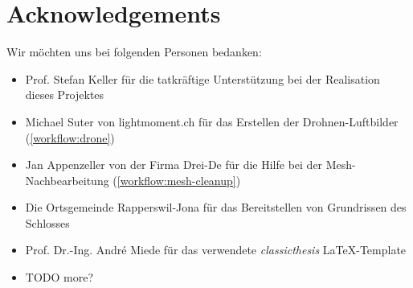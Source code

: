 

\bigskip


\begingroup

\let\clearpage\relax
\let\cleardoublepage\relax
\let\cleardoublepage\relax

\chapter*{Acknowledgements} %

Wir möchten uns bei folgenden Personen bedanken:

\begin{itemize}
	\item Prof. Stefan Keller für die tatkräftige Unterstützung bei der
		Realisation dieses Projektes
	\item Michael Suter von lightmoment.ch für das Erstellen der
		Drohnen-Luftbilder (\autoref{workflow:drone})
	\item Jan Appenzeller von der Firma Drei-De für die Hilfe bei der
		Mesh-Nachbearbeitung (\autoref{workflow:mesh-cleanup})
	\item Die Ortsgemeinde Rapperswil-Jona für das Bereitstellen von Grundrissen
		des Schlosses
	\item Prof. Dr.-Ing. André Miede für das verwendete \emph{classicthesis}
		\LaTeX-Template
	\item TODO more?
\end{itemize}


\endgroup
